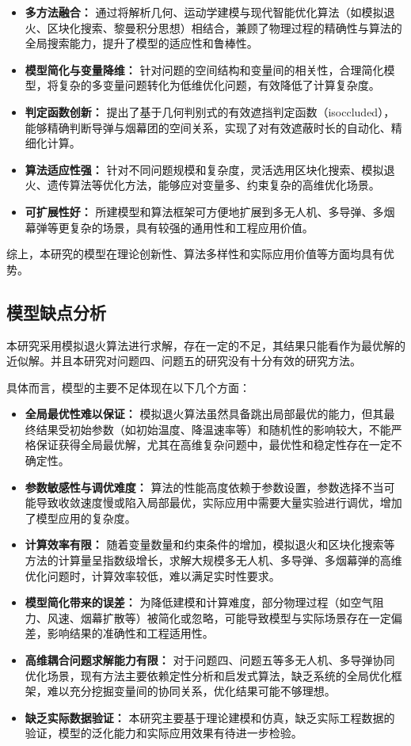 \documentclass{article}
\begin{document}
\begin{itemize}
    \item \textbf{多方法融合：} 通过将解析几何、运动学建模与现代智能优化算法（如模拟退火、区块化搜索、黎曼积分思想）相结合，兼顾了物理过程的精确性与算法的全局搜索能力，提升了模型的适应性和鲁棒性。
    \item \textbf{模型简化与变量降维：} 针对问题的空间结构和变量间的相关性，合理简化模型，将复杂的多变量问题转化为低维优化问题，有效降低了计算复杂度。
    \item \textbf{判定函数创新：} 提出了基于几何判别式的有效遮挡判定函数（isoccluded），能够精确判断导弹与烟幕团的空间关系，实现了对有效遮蔽时长的自动化、精细化计算。
    \item \textbf{算法适应性强：} 针对不同问题规模和复杂度，灵活选用区块化搜索、模拟退火、遗传算法等优化方法，能够应对变量多、约束复杂的高维优化场景。
    \item \textbf{可扩展性好：} 所建模型和算法框架可方便地扩展到多无人机、多导弹、多烟幕弹等更复杂的场景，具有较强的通用性和工程应用价值。
\end{itemize}

综上，本研究的模型在理论创新性、算法多样性和实际应用价值等方面均具有优势。

\subsection{模型缺点分析}
本研究采用模拟退火算法进行求解，存在一定的不足，其结果只能看作为最优解的近似解。并且本研究对问题四、问题五的研究没有十分有效的研究方法。

具体而言，模型的主要不足体现在以下几个方面：

\begin{itemize}
    \item \textbf{全局最优性难以保证：} 模拟退火算法虽然具备跳出局部最优的能力，但其最终结果受初始参数（如初始温度、降温速率等）和随机性的影响较大，不能严格保证获得全局最优解，尤其在高维复杂问题中，最优性和稳定性存在一定不确定性。
    \item \textbf{参数敏感性与调优难度：} 算法的性能高度依赖于参数设置，参数选择不当可能导致收敛速度慢或陷入局部最优，实际应用中需要大量实验进行调优，增加了模型应用的复杂度。
    \item \textbf{计算效率有限：} 随着变量数量和约束条件的增加，模拟退火和区块化搜索等方法的计算量呈指数级增长，求解大规模多无人机、多导弹、多烟幕弹的高维优化问题时，计算效率较低，难以满足实时性要求。
    \item \textbf{模型简化带来的误差：} 为降低建模和计算难度，部分物理过程（如空气阻力、风速、烟幕扩散等）被简化或忽略，可能导致模型与实际场景存在一定偏差，影响结果的准确性和工程适用性。
    \item \textbf{高维耦合问题求解能力有限：} 对于问题四、问题五等多无人机、多导弹协同优化场景，现有方法主要依赖定性分析和启发式算法，缺乏系统的全局优化框架，难以充分挖掘变量间的协同关系，优化结果可能不够理想。
    \item \textbf{缺乏实际数据验证：} 本研究主要基于理论建模和仿真，缺乏实际工程数据的验证，模型的泛化能力和实际应用效果有待进一步检验。
\end{itemize}
\end{document}
